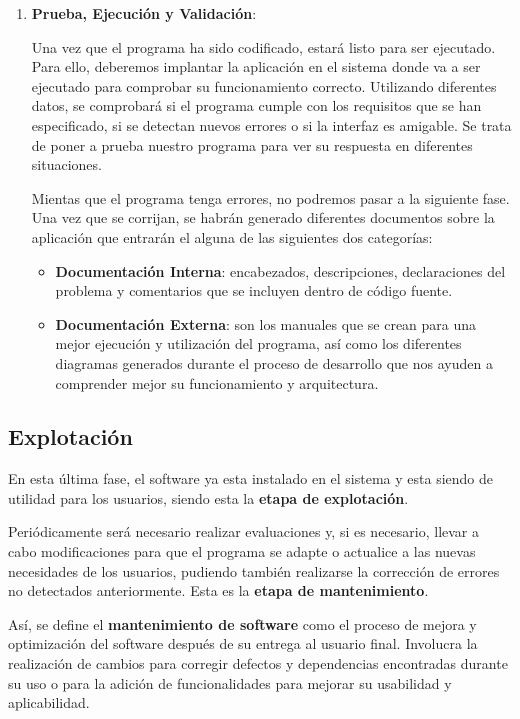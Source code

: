 \begin{enumerate}
    \item \textbf{Prueba, Ejecución y Validación}:

    Una vez que el programa ha sido codificado, estará listo para ser ejecutado. Para ello, deberemos implantar la aplicación en el sistema donde va a ser ejecutado para comprobar su funcionamiento correcto. Utilizando diferentes datos, se comprobará si el programa cumple con los requisitos que se han especificado, si se detectan nuevos errores o si la interfaz es amigable. Se trata de poner a prueba nuestro programa para ver su respuesta en diferentes situaciones.

    Mientas que el programa tenga errores, no podremos pasar a la siguiente fase. Una vez que se corrijan, se habrán generado diferentes documentos sobre la aplicación que entrarán el alguna de las siguientes dos categorías:

    \begin{itemize}
        \item \textbf{Documentación Interna}: encabezados, descripciones, declaraciones del problema y comentarios que se incluyen dentro de código fuente.

        \item \textbf{Documentación Externa}: son los manuales que se crean para una mejor ejecución y utilización del programa, así como los diferentes diagramas generados durante el proceso de desarrollo que nos ayuden a comprender mejor su funcionamiento y arquitectura.
    \end{itemize}
\end{enumerate}

\subsection{Explotación}
En esta última fase, el software ya esta instalado en el sistema y esta siendo de utilidad para los usuarios, siendo esta la \textbf{etapa de explotación}.

Periódicamente será necesario realizar evaluaciones y, si es necesario, llevar a cabo modificaciones para que el programa se adapte o actualice a las nuevas necesidades de los usuarios, pudiendo también realizarse la corrección de errores no detectados anteriormente. Esta es la \textbf{etapa de mantenimiento}.

Así, se define el \textbf{mantenimiento de software} como el proceso de mejora y optimización del software después de su entrega al usuario final. Involucra la realización de cambios para corregir defectos y dependencias encontradas durante su uso o para la adición de funcionalidades para mejorar su usabilidad y aplicabilidad.


